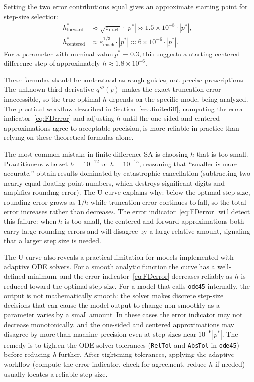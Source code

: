 Setting the two error contributions equal gives an approximate
starting point for step-size selection:
\begin{align}
  h^*_{\text{forward}}  &\approx \sqrt{\varepsilon_{\text{mach}}}\cdot|p^*|
                          \approx 1.5 \times 10^{-8}\cdot|p^*|,
  \label{eq:hopt_fwd} \\
  h^*_{\text{centered}} &\approx \varepsilon_{\text{mach}}^{1/3}\cdot|p^*|
                          \approx 6 \times 10^{-6}\cdot|p^*|.
  \label{eq:hopt_cen}
\end{align}
For a parameter with nominal value $p^* = 0.3$, this suggests
a starting centered-difference step of approximately
$h \approx 1.8 \times 10^{-6}$.

These formulas should be understood as rough guides, not precise
prescriptions. The unknown third derivative $q'''(p)$ makes
the exact truncation error inaccessible, so the
true optimal $h$ depends on the specific model being analyzed.
The practical workflow described in Section~\ref{sec:finitediff},
computing the error indicator~\eqref{eq:FDerror} and
adjusting $h$ until the one-sided and centered approximations
agree to acceptable precision, is more reliable in practice
than relying on these theoretical formulas alone.

The most common mistake in finite-difference SA is choosing $h$
that is too small. Practitioners who set $h = 10^{-12}$ or
$h = 10^{-15}$, reasoning that ``smaller is more accurate,''
obtain results dominated by catastrophic cancellation
(subtracting two nearly equal floating-point numbers, which destroys
significant digits and amplifies rounding error).
The U-curve explains why: below the optimal step size,
rounding error grows as $1/h$ while truncation error continues
to fall, so the total error increases rather than decreases.
The error indicator~\eqref{eq:FDerror} will detect this failure:
when $h$ is too small, the centered and forward approximations
both carry large rounding errors and will disagree by a large
relative amount, signaling that a larger step size is needed.

The U-curve also reveals a practical limitation for models
implemented with adaptive ODE solvers.
For a smooth analytic function the curve has a well-defined minimum,
and the error indicator~\eqref{eq:FDerror} decreases reliably as
$h$ is reduced toward the optimal step size.
For a model that calls \texttt{ode45} internally, the output is not
mathematically smooth: the solver makes discrete step-size decisions
that can cause the model output to change non-smoothly as a
parameter varies by a small amount.
In these cases the error indicator may not decrease monotonically,
and the one-sided and centered approximations may disagree by more
than machine precision even at step sizes near $10^{-6}|p^*|$.
The remedy is to tighten the ODE solver tolerances
(\texttt{RelTol} and \texttt{AbsTol} in \texttt{ode45}) before
reducing $h$ further. After tightening tolerances, applying
the adaptive workflow (compute the error indicator,
check for agreement, reduce $h$ if needed) usually
locates a reliable step size.


